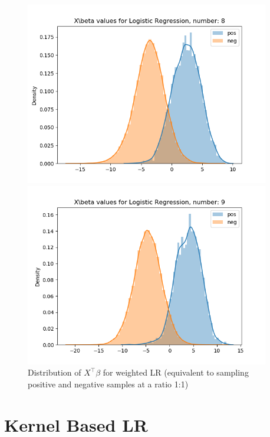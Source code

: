 \documentclass{article}
\begin{document}
\begin{figure}[H]
\begin{minipage}{0.19\textwidth}
    \end{minipage}
    \begin{minipage}{0.19\textwidth}
        \centering
        \includegraphics[width=0.95\textwidth]{fig/lr/8_weighted.png}
    \end{minipage}
    \begin{minipage}{0.19\textwidth}
        \centering
        \includegraphics[width=0.95\textwidth]{fig/lr/9_weighted.png}
    \end{minipage}
    \caption{Distribution of $X^\top\beta$ for weighted LR (equivalent to sampling positive and negative samples at a ratio 1:1)}
\end{figure}

\section{Kernel Based LR}
\end{document}

